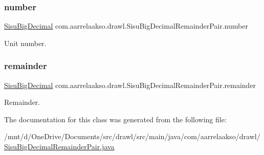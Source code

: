 \subsubsection{\texorpdfstring{number}{number}}
{\footnotesize\ttfamily \hyperlink{classcom_1_1aarrelaakso_1_1drawl_1_1_sisu_big_decimal}{Sisu\+Big\+Decimal} com.\+aarrelaakso.\+drawl.\+Sisu\+Big\+Decimal\+Remainder\+Pair.\+number\hspace{0.3cm}{\ttfamily [private]}}

Unit number. \mbox{\label{classcom_1_1aarrelaakso_1_1drawl_1_1_sisu_big_decimal_remainder_pair_aa67b06e15115b1930dae9de0aa8e039f}} 
\subsubsection{\texorpdfstring{remainder}{remainder}}
{\footnotesize\ttfamily \hyperlink{classcom_1_1aarrelaakso_1_1drawl_1_1_sisu_big_decimal}{Sisu\+Big\+Decimal} com.\+aarrelaakso.\+drawl.\+Sisu\+Big\+Decimal\+Remainder\+Pair.\+remainder\hspace{0.3cm}{\ttfamily [private]}}

Remainder. 

The documentation for this class was generated from the following file\+:\begin{DoxyCompactItemize}
\item 
/mnt/d/\+One\+Drive/\+Documents/src/drawl/src/main/java/com/aarrelaakso/drawl/\hyperlink{_sisu_big_decimal_remainder_pair_8java}{Sisu\+Big\+Decimal\+Remainder\+Pair.\+java}\end{DoxyCompactItemize}
